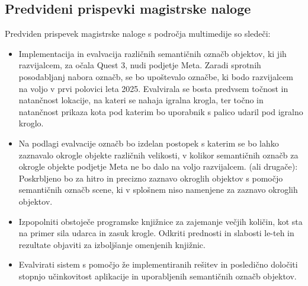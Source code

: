 \documentclass[a4paper, 12pt]{article}
\begin{document}
\subsection{Predvideni prispevki magistrske naloge}
Predviden prispevek magistrske naloge s področja multimedije so sledeči:
\begin{itemize}
    \item Implementacija in evalvacija različnih semantičnih označb objektov, ki jih razvijalcem, za očala Quest 3, nudi podjetje Meta. Zaradi sprotnih posodabljanj nabora označb, se bo upoštevalo označbe, ki bodo razvijalcem na voljo v prvi polovici leta 2025. Evalvirala se bosta predvsem točnost in natančnost lokacije, na kateri se nahaja igralna krogla, ter točno in natančnost prikaza kota pod katerim bo uporabnik s palico udaril pod igralno kroglo.
    \item Na podlagi evalvacije označb bo izdelan postopek s katerim se bo lahko zaznavalo okrogle objekte različnih velikosti, v kolikor semantičnih označb za okrogle objekte podjetje Meta ne bo dalo na voljo razvijalcem. (ali drugače): Poskrbljeno bo za hitro in precizno zaznavo okroglih objektov s pomočjo semantičnih označb scene, ki v splošnem niso namenjene za zaznavo okroglih objektov. 
    \item Izpopolniti obstoječe programske knjižnice za zajemanje večjih količin, kot sta na primer sila udarca in zasuk krogle. Odkriti prednosti in slabosti le-teh in rezultate objaviti za izboljšanje omenjenih knjižnic.
    \item Evalvirati sistem s pomočjo že implementiranih rešitev \cite{Sousa2016} \cite{MiraclePool} in posledično določiti stopnjo učinkovitost aplikacije in uporabljenih semantičnih označb objektov.
\end{itemize}
\end{document}
